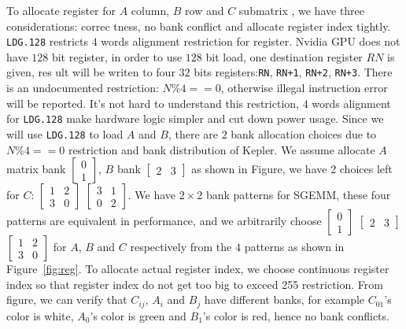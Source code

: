 To allocate register for $A$ column, $B$ row and $C$ submatrix , we have three considerations: correc
tness, no bank
conflict and allocate register index tightly.
{\tt LDG.128} restricts $4$ words alignment restriction for register.
Nvidia GPU does not have $128$ bit register, in order to use $128$ bit load, one destination register $RN$ is given, res
ult will be writen to
four $32$ bits registers:{\tt RN}, {\tt RN+1}, {\tt RN+2}, {\tt RN+3}. There is an undocumented restriction: $N\%4==0$, 
otherwise illegal instruction error will be reported.
It's not hard to understand this restriction, $4$ words alignment for {\tt LDG.128} make hardware logic simpler and cut 
down power usage.
Since we will use {\tt LDG.128} to load $A$ and $B$, there are $2$ bank allocation choices due to $N\%4==0$ restriction 
and
bank distribution of Kepler. We assume allocate $A$ matrix bank $\begin{bmatrix} 0 \\ 1  \end{bmatrix}$,
$B$ bank $\begin{bmatrix} 2 & 3 \end{bmatrix}$ as shown in Figure, we have 2 choices left for $C$:
$\begin{bmatrix} 1 & 2 \\ 3 & 0  \end{bmatrix}$
$\begin{bmatrix} 3 & 1 \\ 0 & 2  \end{bmatrix}$.
We have $2\times2$ bank patterns for SGEMM, these four patterns are equivalent in performance, and we arbitrarily choose
 $\begin{bmatrix} 0 \\ 1  \end{bmatrix}$ $\begin{bmatrix} 2 & 3 \end{bmatrix}$
    $\begin{bmatrix} 1 & 2 \\ 3 & 0  \end{bmatrix}$ for $A$, $B$ and $C$ respectively from the $4$ patterns as shown in 
Figure~\ref{fig:reg}.
To allocate actual register index, we choose continuous register index so that register index do not get too big to
exceed 255 restriction. From figure, we can verify that $C_{ij}$, $A_i$ and $B_j$ have different banks, for example
$C_{01}$'s color is white, $A_0$'s color is green and $B_1$'s color is red, hence no bank conflicts.

